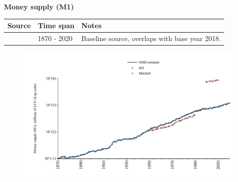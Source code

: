 \documentclass[12pt,a4paper,landscape]{article}
\begin{document}
\begin{adjustbox}{max totalsize={\paperwidth}{\paperheight},center}
\begin{minipage}[t][\textheight][t]{\textwidth}
\vspace*{0.5cm}
{}
\begin{center}
{\Large\bfseries Money supply (M1)}
\end{center}
\vspace{0.5cm}
\begin{table}[H]
\centering
\small
\begin{tabular}{|l|l|l|}
\hline
\textbf{Source} & \textbf{Time span} & \textbf{Notes} \\
\hline
\rowcolor{white}\cite{JST}& 1870 - 2020 &Baseline source, overlaps with base year 2018. \\
\hline
\end{tabular}
\end{table}
\begin{figure}[H]
\centering
\includegraphics[width=\textwidth,height=0.6\textheight,keepaspectratio]{graphs/FIN_M1.pdf}
\end{figure}
\end{minipage}
\end{adjustbox}
\end{document}
